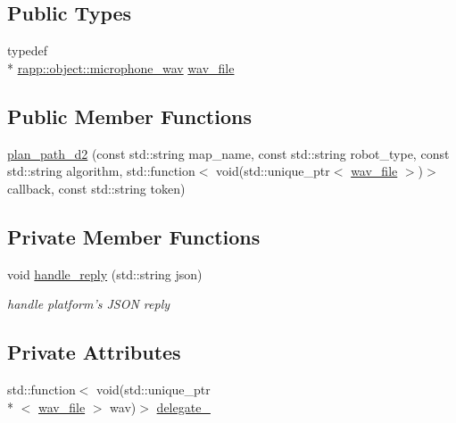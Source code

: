 \subsection*{Public Types}
\begin{DoxyCompactItemize}
\item 
typedef \\*
\hyperlink{classrapp_1_1object_1_1microphone__wav}{rapp\-::object\-::microphone\-\_\-wav} \hyperlink{classrapp_1_1cloud_1_1plan__path__2d_a95a605680256fbdf50b3ac0dcff4888f}{wav\-\_\-file}
\end{DoxyCompactItemize}
\subsection*{Public Member Functions}
\begin{DoxyCompactItemize}
\item 
\hyperlink{classrapp_1_1cloud_1_1plan__path__2d_abda530d8b67fbd6a021c1f4a5cdb39bc}{plan\-\_\-path\-\_\-d2} (const std\-::string map\-\_\-name, const std\-::string robot\-\_\-type, const std\-::string algorithm, std\-::function$<$ void(std\-::unique\-\_\-ptr$<$ \hyperlink{classrapp_1_1cloud_1_1plan__path__2d_a95a605680256fbdf50b3ac0dcff4888f}{wav\-\_\-file} $>$)$>$ callback, const std\-::string token)
\end{DoxyCompactItemize}
\subsection*{Private Member Functions}
\begin{DoxyCompactItemize}
\item 
void \hyperlink{classrapp_1_1cloud_1_1plan__path__2d_aa78107b6cc049e3edb67a6c504755d8c}{handle\-\_\-reply} (std\-::string json)
\begin{DoxyCompactList}\small\item\em handle platform's J\-S\-O\-N reply \end{DoxyCompactList}\end{DoxyCompactItemize}
\subsection*{Private Attributes}
\begin{DoxyCompactItemize}
\item 
std\-::function$<$ void(std\-::unique\-\_\-ptr\\*
$<$ \hyperlink{classrapp_1_1cloud_1_1plan__path__2d_a95a605680256fbdf50b3ac0dcff4888f}{wav\-\_\-file} $>$ wav)$>$ \hyperlink{classrapp_1_1cloud_1_1plan__path__2d_a10752ebb3997d250e3d07c8f51dad77b}{delegate\-\_\-}
\end{DoxyCompactItemize}
